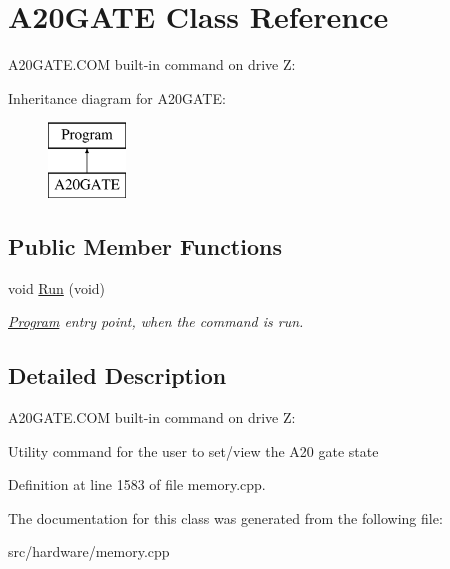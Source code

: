 \hypertarget{classA20GATE}{\section{A20\-G\-A\-T\-E Class Reference}
\label{classA20GATE}
}


A20\-G\-A\-T\-E.\-C\-O\-M built-\/in command on drive Z\-:  


Inheritance diagram for A20\-G\-A\-T\-E\-:\begin{figure}[H]
\begin{center}
\leavevmode
\includegraphics[height=2.000000cm]{classA20GATE}
\end{center}
\end{figure}
\subsection*{Public Member Functions}
\begin{DoxyCompactItemize}
\item 
\hypertarget{classA20GATE_a7d53ddb7d6453f710b7e829b5c0f6ca3}{void \hyperlink{classA20GATE_a7d53ddb7d6453f710b7e829b5c0f6ca3}{Run} (void)}\label{classA20GATE_a7d53ddb7d6453f710b7e829b5c0f6ca3}

\begin{DoxyCompactList}\small\item\em \hyperlink{classProgram}{Program} entry point, when the command is run. \end{DoxyCompactList}\end{DoxyCompactItemize}


\subsection{Detailed Description}
A20\-G\-A\-T\-E.\-C\-O\-M built-\/in command on drive Z\-: 

Utility command for the user to set/view the A20 gate state 

Definition at line 1583 of file memory.\-cpp.



The documentation for this class was generated from the following file\-:\begin{DoxyCompactItemize}
\item 
src/hardware/memory.\-cpp\end{DoxyCompactItemize}
